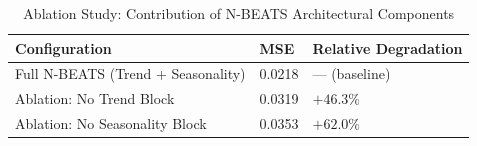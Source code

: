 \begin{table}[H]
\caption{Ablation Study: Contribution of N-BEATS Architectural Components}
\begin{center}
\begin{tabular}{l l l}
\toprule
\textbf{Configuration} & \textbf{MSE} & \textbf{Relative Degradation} \\
\midrule
Full N-BEATS (Trend + Seasonality) & 0.0218 & --- (baseline) \\
Ablation: No Trend Block & 0.0319 & $+46.3\%$ \\
Ablation: No Seasonality Block & 0.0353 & $+62.0\%$ \\
\bottomrule
\end{tabular}
\end{center}
\end{table}
